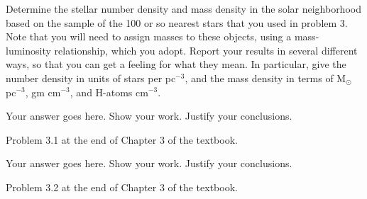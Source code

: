 \documentclass[12pt]{article}
\newenvironment{problem}[2][Problem]{\begin{trivlist}
\item[\hskip \labelsep {\bfseries #1}\hskip \labelsep {\bfseries #2.}]}{\end{trivlist}}
\newenvironment{answer}[2][Answer]{\begin{trivlist}
\item[\hskip \labelsep {\bfseries #1}\hskip \labelsep {\bfseries #2.}]}{\end{trivlist}}
\begin{document}
\begin{answer}{3}
\end{answer}

\begin{problem}{4}
  Determine the stellar number density and mass density in the solar neighborhood based on the sample of the 100 or so nearest stars that you used in problem 3. Note that you will need to assign masses to these objects, using a mass-luminosity relationship, which you adopt. Report your results in several different ways, so that you can get a feeling for what they mean. In particular, give the number density in units of stars per pc$^{-3}$, and the mass density in terms of M$_\odot$ pc$^{-3}$, gm cm$^{-3}$, and H-atoms cm$^{-3}$.
\end{problem}

\begin{answer}{4}
Your answer goes here. Show your work. Justify your conclusions.
\end{answer}




\begin{problem}{5}
  Problem 3.1 at the end of Chapter 3 of the textbook.
\end{problem}

\begin{answer}{5}
Your answer goes here. Show your work. Justify your conclusions.
\end{answer}




\begin{problem}{6}
  Problem 3.2 at the end of Chapter 3 of the textbook.
\end{problem}


\begin{answer}{6}
\end{answer}
\end{document}
